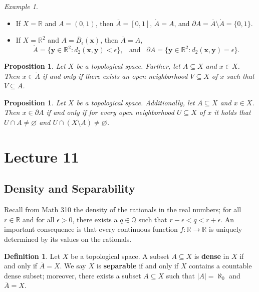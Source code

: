 \documentclass[ 12pt ]{article}
\newcounter{lecture_num}
\theoremstyle{plain}
\theoremstyle{plain}
\newtheorem{proposition}[theorem]{Proposition}
\theoremstyle{definition}
\newtheorem{definition}[theorem]{Definition}
\theoremstyle{remark}
\newtheorem{example}[theorem]{Example}
\begin{document}
\begin{example} $ $
	\begin{itemize}
		\item If $X = \mathbb{R}$ and $A = (0, 1)$, then $\overline{A} = [0, 1]$, $\mathring{A} = A$, and $\partial A = \overline{A} \setminus \mathring{A} = \{0, 1\}$.
		\item If $X = \mathbb{R}^2$ and $A = \overline{B}_\epsilon(\textbf{x})$, then $\overline{A} = A$, $$\mathring{A} = \{ \textbf{y} \in \mathbb{R}^2 : d_2(\textbf{x}, \textbf{y}) <
			\epsilon \},\;\;\; \mathrm{and}\;\;\; \partial A = \{ \textbf{y} \in \mathbb{R}^2 : d_2(\textbf{x}, \textbf{y}) = \epsilon \}.$$
	\end{itemize}
\end{example}

\begin{proposition}
	Let $X$ be a topological space. Further, let $A \subseteq X$ and $x \in X$. Then $x \in \mathring{A}$ if and only if there exists an open neighborhood $V \subseteq X$ of $x$ such
	that $V \subseteq A$.
\end{proposition}

\begin{proposition}
	Let $X$ be a topological space. Additionally, let $A \subseteq X$ and $x \in X$. Then $x \in \partial A$ if and only if for every open neighborhood $U \subseteq X$ of $x$ it holds
	that $U \cap A \neq \varnothing$ and $U \cap (X \setminus A) \neq \varnothing$.
\end{proposition}


\setcounter{lecture_num}{11}
\setcounter{theorem}{0}
\section*{Lecture 11}

\subsection*{Density and Separability}

Recall from Math 310 the density of the rationals in the real numbers; for all $r \in \mathbb{R}$ and for all $\epsilon > 0$, there exists a $q \in \mathbb{Q}$ such that $r - \epsilon <
q < r + \epsilon$. An important consequence is that every continuous function $f : \mathbb{R} \to \mathbb{R}$ is uniquely determined by its values on the rationals.

\begin{definition}
	Let $X$ be a topological space. A subset $A \subseteq X$ is \textbf{dense} in $X$ if and only if $\overline{A} = X$. We say $X$ is \textbf{separable} if and only if $X$ contains a
	countable dense subset; moreover, there exists a subset $A \subseteq X$ such that $|A| = \aleph_0$ and $\overline{A} = X$.
\end{definition}
\end{document}

